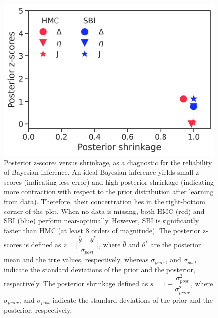 \documentclass[preprint,11pt,authoryear]{elsarticle}
\begin{document}
\begin{figure}[ht]
    \centering
    \includegraphics[width=0.75\linewidth]{Figs/FigS6.png}
    \renewcommand{\thefigure}{S\arabic{figure}}
    \caption{Posterior z-scores versus shrinkage, as a diagnostic for the reliability of Bayesian inference. An ideal Bayesian inference yields small z-scores (indicating less error) and high posterior shrinkage (indicating more contraction with respect to the prior distribution after learning from data). Therefore, their concentration lies in the right-bottom corner of the plot. When no data is missing, both HMC (red) and SBI (blue) perform near-optimally. However, SBI is significantly faster than HMC (at least 8 orders of magnitude). The posterior z-scores is defined as $z = \mathopen | \dfrac{\bar \theta-\theta^\ast}{\sigma_{post}}\mathclose|$, where $\bar \theta$ and $\theta^\ast$ are the posterior mean and the true values, respectively, whereas $\sigma_{prior}$, and $\sigma_{post}$ indicate the standard deviations of the prior and the posterior, respectively. The posterior shrinkage defined as $s= 1- \dfrac{\sigma^2_{post}}{\sigma^2_{prior}}$, where $\sigma_{prior}$, and $\sigma_{post}$ indicate the standard deviations of the prior and the posterior, respectively. 
    } 
    \label{fig:Zscores_Shrinkage_SDE}
\end{figure}
\end{document}
